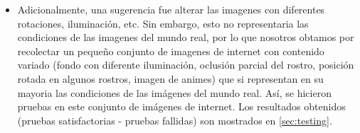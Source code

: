 \begin{itemize}
\item Adicionalmente, una sugerencia fue alterar las imagenes con diferentes rotaciones, iluminación, etc. Sin embargo, esto no representaria las condiciones de las imagenes del mundo real, por lo que nosotros obtamos por recolectar un pequeño conjunto de imagenes de internet con contenido variado (fondo con diferente iluminación, oclusión parcial del rostro, posición rotada en algunos rostros, imagen de animes) que si representan en su mayoria las condiciones de las imágenes del mundo real. Así, se  hicieron pruebas en este conjunto de imágenes de internet. Los resultados obtenidos (pruebas satisfactorias - pruebas fallidas) son mostrados en \ref{sec:testing}.

\end{itemize}